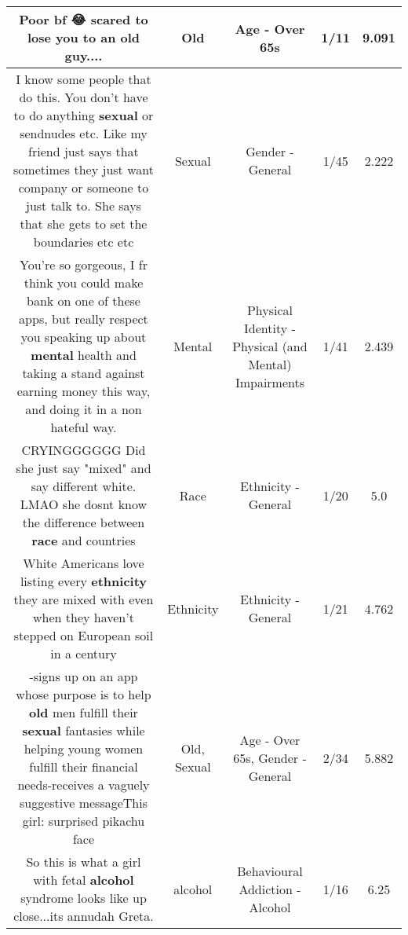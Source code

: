 \documentclass[11pt]{article}
\newlength\mylength
\begin{document}
\begin{center}
\begin{longtable}{|C{.65\mylength}|C{.30\mylength}|C{.12\mylength}|C{.12\mylength}|C{.12\mylength}|}
  \small Poor bf 😂 scared to lose you to an \textbf{old} guy....\normalsize   & Old & Age - Over 65s & 1/11 & 9.091 \\  \hline
  \small I know some people that do this. You don't have to do anything \textbf{sexual} or sendnudes etc. Like my friend just says that sometimes they just want company or someone to just talk to. She says that she gets to set the boundaries etc etc\normalsize   & Sexual & Gender - General & 1/45 & 2.222 \\  \hline
  \small You're so gorgeous, I fr think you could make bank on one of these apps, but really respect you speaking up about \textbf{mental} health and taking a stand against earning money this way, and doing it in a non hateful way.\normalsize   & Mental & Physical Identity - Physical (and Mental) Impairments & 1/41 & 2.439 \\  \hline
  \small CRYINGGGGGG Did she just say "mixed" and say different white. LMAO she dosnt know the difference between \textbf{race} and countries\normalsize   & Race & Ethnicity - General & 1/20 & 5.0 \\  \hline
  \small White Americans love listing every \textbf{ethnicity} they are mixed with even when they haven't stepped on European soil in a century\normalsize   & Ethnicity & Ethnicity - General & 1/21 & 4.762 \\  \hline
  \small -signs up on an app whose purpose is to help \textbf{old} men fulfill their \textbf{sexual} fantasies while helping young women fulfill their financial needs-receives a vaguely suggestive messageThis girl: surprised pikachu face\normalsize   & Old, Sexual & Age - Over 65s, Gender - General & 2/34 & 5.882 \\  \hline
  \small So this is what a girl with fetal \textbf{alcohol} syndrome looks like up close...its annudah Greta.\normalsize   & alcohol & Behavioural Addiction - Alcohol & 1/16 & 6.25 \\  \hline

\end{longtable}
\end{center}
\end{document}
